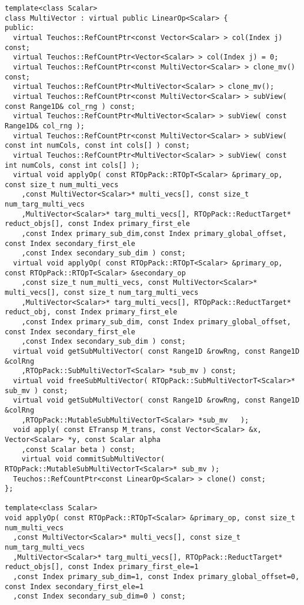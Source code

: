 {\begin{verbatim}
template<class Scalar>
class MultiVector : virtual public LinearOp<Scalar> {
public:
  virtual Teuchos::RefCountPtr<const Vector<Scalar> > col(Index j) const;
  virtual Teuchos::RefCountPtr<Vector<Scalar> > col(Index j) = 0;
  virtual Teuchos::RefCountPtr<const MultiVector<Scalar> > clone_mv() const;
  virtual Teuchos::RefCountPtr<MultiVector<Scalar> > clone_mv();
  virtual Teuchos::RefCountPtr<const MultiVector<Scalar> > subView( const Range1D& col_rng ) const;
  virtual Teuchos::RefCountPtr<MultiVector<Scalar> > subView( const Range1D& col_rng );
  virtual Teuchos::RefCountPtr<const MultiVector<Scalar> > subView( const int numCols, const int cols[] ) const;
  virtual Teuchos::RefCountPtr<MultiVector<Scalar> > subView( const int numCols, const int cols[] );
  virtual void applyOp( const RTOpPack::RTOpT<Scalar> &primary_op, const size_t num_multi_vecs
    ,const MultiVector<Scalar>* multi_vecs[], const size_t num_targ_multi_vecs
    ,MultiVector<Scalar>* targ_multi_vecs[], RTOpPack::ReductTarget* reduct_objs[], const Index primary_first_ele
    ,const Index primary_sub_dim,const Index primary_global_offset, const Index secondary_first_ele
    ,const Index secondary_sub_dim ) const;
  virtual void applyOp( const RTOpPack::RTOpT<Scalar> &primary_op, const RTOpPack::RTOpT<Scalar> &secondary_op
    ,const size_t num_multi_vecs, const MultiVector<Scalar>* multi_vecs[], const size_t num_targ_multi_vecs
    ,MultiVector<Scalar>* targ_multi_vecs[], RTOpPack::ReductTarget* reduct_obj, const Index primary_first_ele
    ,const Index primary_sub_dim, const Index primary_global_offset, const Index secondary_first_ele
    ,const Index secondary_sub_dim ) const;
  virtual void getSubMultiVector( const Range1D &rowRng, const Range1D &colRng
    ,RTOpPack::SubMultiVectorT<Scalar> *sub_mv ) const;
  virtual void freeSubMultiVector( RTOpPack::SubMultiVectorT<Scalar>* sub_mv ) const;
  virtual void getSubMultiVector( const Range1D &rowRng, const Range1D &colRng
    ,RTOpPack::MutableSubMultiVectorT<Scalar> *sub_mv	);
  void apply( const ETransp M_trans, const Vector<Scalar> &x, Vector<Scalar> *y, const Scalar alpha
    ,const Scalar beta ) const;
	virtual void commitSubMultiVector( RTOpPack::MutableSubMultiVectorT<Scalar>* sub_mv );
  Teuchos::RefCountPtr<const LinearOp<Scalar> > clone() const;
};

template<class Scalar>
void applyOp( const RTOpPack::RTOpT<Scalar> &primary_op, const size_t num_multi_vecs
  ,const MultiVector<Scalar>* multi_vecs[], const size_t num_targ_multi_vecs
  ,MultiVector<Scalar>* targ_multi_vecs[], RTOpPack::ReductTarget* reduct_objs[], const Index primary_first_ele=1
  ,const Index primary_sub_dim=1, const Index primary_global_offset=0, const Index secondary_first_ele=1
  ,const Index secondary_sub_dim=0 ) const;


\end{verbatim}}
